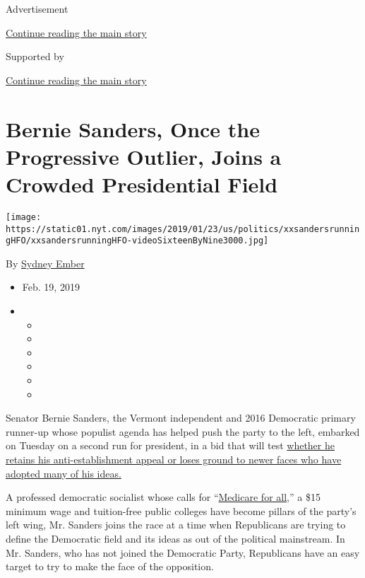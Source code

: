 Advertisement

\protect\hyperlink{after-top}{Continue reading the main story}

Supported by

\protect\hyperlink{after-sponsor}{Continue reading the main story}

\hypertarget{bernie-sanders-once-the-progressive-outlier-joins-a-crowded-presidential-field}{%
\section{Bernie Sanders, Once the Progressive Outlier, Joins a Crowded
Presidential
Field}\label{bernie-sanders-once-the-progressive-outlier-joins-a-crowded-presidential-field}}

\texttt{[image: https://static01.nyt.com/images/2019/01/23/us/politics/xxsandersrunningHFO/xxsandersrunningHFO-videoSixteenByNine3000.jpg]}

By \href{https://www.nytimes.com/by/sydney-ember}{Sydney Ember}

\begin{itemize}
\item
  Feb. 19, 2019
\item
  \begin{itemize}
  \item
  \item
  \item
  \item
  \item
  \item
  \end{itemize}
\end{itemize}

Senator Bernie Sanders, the Vermont independent and 2016 Democratic
primary runner-up whose populist agenda has helped push the party to the
left, embarked on Tuesday on a second run for president, in a bid that
will test
\href{https://www.nytimes.com/2019/02/19/us/politics/on-politics-bernie-2020.html}{whether
he retains his anti-establishment appeal or loses ground to newer faces
who have adopted many of his ideas.}

A professed democratic socialist whose calls for
``\href{https://www.nytimes.com/2019/02/02/us/politics/medicare-for-all-2020.html}{Medicare
for all},'' a \$15 minimum wage and tuition-free public colleges have
become pillars of the party's left wing, Mr. Sanders joins the race at a
time when Republicans are trying to define the Democratic field and its
ideas as out of the political mainstream. In Mr. Sanders, who has not
joined the Democratic Party, Republicans have an easy target to try to
make the face of the opposition.

